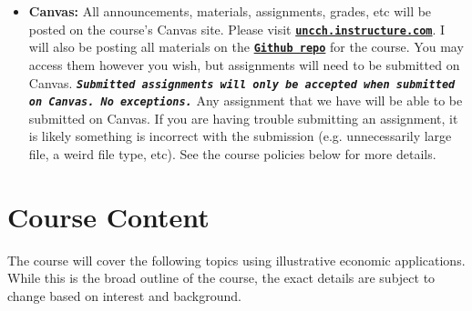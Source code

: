 \documentclass[11pt]{article}
\begin{document}
\begin{itemize}
    \item \textbf{Canvas:} All announcements, materials, assignments, grades, etc will be posted on the course's Canvas site. Please visit \href{https://uncch.instructure.com/}{\tt\bf uncch.instructure.com}. I will also be posting all materials on the \href{https://github.com/drewvankuiken/ECON370}{\tt\bf Github repo} for the course. You may access them however you wish, but assignments will need to be submitted on Canvas. {\tt\bf  \emph{Submitted assignments will only be accepted when submitted on Canvas. No exceptions.}} Any assignment that we have will be able to be submitted on Canvas. If you are having trouble submitting an assignment, it is likely something is incorrect with the submission (e.g. unnecessarily large file, a weird file type, etc). See the course policies below for more details.
\end{itemize}


\section*{Course Content}
The course will cover the following topics using illustrative economic applications. While this is the broad outline of the course, the exact details are subject to change based on interest and background.
\end{document}

